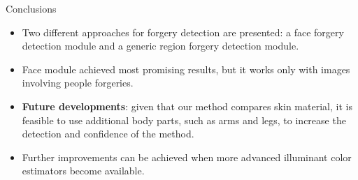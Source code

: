 \begin{tframe}{Conclusions}
\begin{itemize}
\vspace{0.1cm}
\item Two different approaches for forgery detection are presented: a face forgery detection module and a generic region forgery detection module.
\vspace{0.1cm}
\item Face module achieved most promising results, but it works only with images involving people forgeries.
\vspace{0.1cm}
\item \textbf{Future developments}: given that our method compares skin material, it is feasible to use additional body parts, such as arms and legs, to increase the detection and confidence of the method.
\vspace{0.1cm}
\item Further improvements can be achieved when more advanced illuminant color estimators become available.
\end{itemize}
\end{tframe}
